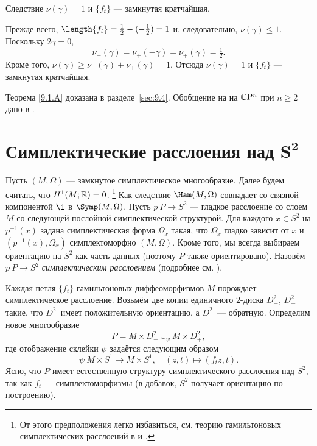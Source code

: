 \begin{thm}[(\cite{LM2})]{Следствие} $\nu(\gamma) = 1$ и $\{f_t\}$ —
  замкнутая кратчайшая.
\end{thm}

Прежде всего, $\length\{f_t\} =\frac12 - (-\frac12 ) = 1$ и,
следовательно, $\nu(\gamma) \le 1$. 
Поскольку $2\gamma = 0$, 
\[\nu_- (\gamma) = \nu_+ (-\gamma) = \nu_+ (\gamma) =\tfrac12.\]
Кроме того, $\nu(\gamma) \ge \nu_- (\gamma) + \nu_+ (\gamma) = 1$.
Отсюда $\nu(\gamma) = 1$ и $\{f_t\}$ — замкнутая кратчайшая.
\qeds

Теорема \ref{9.1.A} доказана в разделе~\ref{sec:9.4}.
Обобщение на на $\mathbb{C}\mathrm{P}^n$ при $n \ge 2$ дано в \cite{P3}.

\section[\texorpdfstring{Симплектические расслоения над $S^2$}{Симплектические расслоения над S²}]{Симплектические расслоения над $\bm{S^2}$}
\label{sec:9.2}

Пусть $(M, \Omega)$ — замкнутое симплектическое многообразие.
Далее будем считать, что $H^1 (M;\mathbb{R}) = 0$.%
\footnote{От этого предположения легко избавиться, см. теорию
  гамильтоновых симплектических расслоений в \cite{MS} и \cite{P4}.} 
Как следствие $\Ham(M, \Omega)$ совпадает со связной компонентой $\1$
в $\Symp(M, \Omega)$. 
Пусть $p \: P \to S^2$ — гладкое расслоение со слоем $M$ со
следующей послойной симплектической структурой.
Для каждого $x \in S^2$ на $p^{-1} (x)$ задана симплектическая форма
$\Omega_x$ такая, что $\Omega_x$ гладко зависит от $x$ и $(p^{-1} (x),
\Omega_x)$  симплектоморфно $(M, \Omega)$.
Кроме того, мы всегда выбираем ориентацию на $S^2$ как часть данных
(поэтому $P$ также ориентировано).
Назовём $p\: P\to S^2$ \emph{симплектическим расслоением} (подробнее
см. \cite{MS}). 

Каждая петля $\{f_t\}$ гамильтоновых диффеоморфизмов $M$ порождает
симплектическое расслоение.
Возьмём две копии единичного $2$-диска $D_+^2$, $D_-^2$ такие, что
$D_+^2$ имеет положительную ориентацию, а $D_-^2$ — обратную.
Определим новое многообразие
\[P =  M  \times D_-^2 \cup_\psi M \times D_+^2,\]
где отображение склейки $\psi$ задаётся следующим образом
\[\psi \: M \times S^1 \to M \times S^1,\quad (z, t) \mapsto (f_t z, t).\]
Ясно, что $P$ имеет естественную структуру симплектического расслоения
над $S^2$, так как $f_t$ — симплектоморфизмы (в добавок, $S^2$
получает ориентацию по построению).

